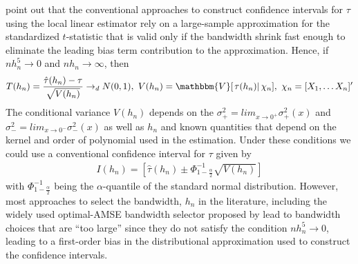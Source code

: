 \documentclass[12pt,fleqn]{article}
\begin{document}
\cite{calonico2014} point out that the conventional approaches to construct 
confidence intervals for $\tau$ using the local linear estimator rely on a 
large-sample approximation for the standardized $t$-statistic that is valid only
if the bandwidth shrink fast enough to eliminate the leading bias term 
contribution to the approximation. Hence, if $nh_{n}^{5}\rightarrow0$ and 
$nh_{n}\rightarrow \infty$, then
 \begin{align}
  T(h_{n})=\frac{\hat{\tau}(h_{n})-\tau}{\sqrt{V(h_{n})}}\rightarrow_{d}N(0,1),
  \text{        }V(h_{n})=\mathbbm{V}[\left.\tau(h_{n})\right|\chi_{n}],
  \text{        }\chi_{n}=[X_{1}, \dots X_{n}]^{\prime}
 \end{align}
 The conditional variance $V(h_{n})$ depends on the $\sigma^{2}_{+}=
 lim_{x \rightarrow 0^{+}}\sigma^{2}_{+}(x)$ and $\sigma^{2}_{-}=
 lim_{x \rightarrow 0^{-}}\sigma^{2}_{-}(x)$ as well as $h_{n}$ and known 
 quantities that depend on the kernel and order of polynomial used in the 
 estimation. Under these conditions we could use a conventional confidence 
 interval for $\tau$ given by
 \begin{align}
  I(h_{n})=\left[\hat{\tau}(h_{n})\pm \Phi^{-1}_{1-\frac{\alpha}{2}}\sqrt{V(h_{n})} \right]
 \end{align}
with $\Phi^{-1}_{1-\frac{\alpha}{2}}$ being the $\alpha$-quantile of the 
standard normal distribution. However, most approaches to select the bandwidth, 
$h_{n}$ in the literature, including the widely used optimal-AMSE bandwidth 
selector proposed by \cite{IK} lead to bandwidth choices that are ``too large'' 
since they do not satisfy the condition $nh_{n}^{5}\rightarrow0$, leading to a 
first-order bias in the distributional approximation used to construct the 
confidence intervals.
\end{document}
